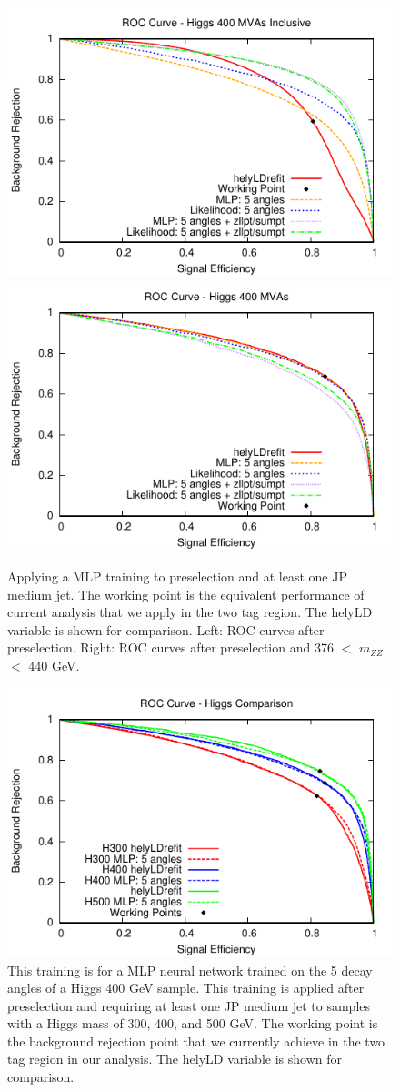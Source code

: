 \begin{figure}[htb!]
\begin{center}
\centerline{
\includegraphics[width=0.5\linewidth]{Optimization/plots/NN/pretag_ROC_400.pdf}
\includegraphics[width=0.5\linewidth]{Optimization/plots/NN/pretag_ROC_400_wincut.pdf}
}
\caption{Applying a MLP training to preselection and at least one JP medium jet.  The working point is the equivalent performance of current analysis that we apply in the two tag region. The helyLD variable is shown for comparison. Left: ROC curves after preselection.  Right: ROC curves after preselection and 376 $<$ $m_{ZZ}$ $<$ 440 GeV.
}
\label{fig:zllptzumpt2}
\end{center}
\end{figure}

\begin{figure}[htb!]
\begin{center}
\centerline{
\includegraphics[width=0.6\linewidth]{Optimization/plots/NN/pretag_ROC_wincut.pdf}
}
\caption{
This training is for a MLP neural network trained on the 5 decay angles of a Higgs 400 GeV sample. This training is applied after preselection and requiring at least one JP medium jet to samples with a Higgs mass of 300, 400, and 500 GeV. The working point is the background rejection point that we currently achieve in the two tag region in our analysis. The helyLD variable is shown for comparison.
}
\label{fig:nn_allhiggs}
\end{center}
\end{figure}




